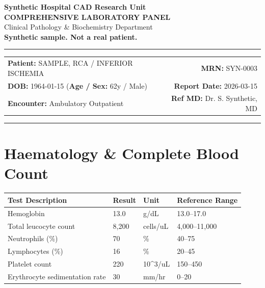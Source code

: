 \documentclass[10pt,a4paper]{article}
\begin{document}
\begin{center}
  {\Large \textbf{Synthetic Hospital CAD Research Unit}}\\
  \vspace{2pt}
  {\normalsize \textbf{COMPREHENSIVE LABORATORY PANEL}}\\
  \vspace{1pt}
  {\footnotesize \textcolor{subtext}{Clinical Pathology \& Biochemistry Department}}\\
  \vspace{4pt}
  {\small \textbf{\textcolor{red!75!black}{Synthetic sample. Not a real patient.}}}\\
  \vspace{3pt}
  \textcolor{linecolor}{\rule{\textwidth}{0.8pt}}
\end{center}

\vspace{2pt}

\noindent
\begin{tabular*}{\textwidth}{@{} l @{\extracolsep{\fill}} r @{}}
  \textbf{Patient:} SAMPLE, RCA / INFERIOR ISCHEMIA & \textbf{MRN:} SYN-0003 \\
  \textbf{DOB:} 1964-01-15 \quad (\textbf{Age / Sex:} 62y / Male) & \textbf{Report Date:} 2026-03-15 \\
  \textbf{Encounter:} Ambulatory Outpatient & \textbf{Ref MD:} Dr. S. Synthetic, MD \\
\end{tabular*}

\vspace{2pt}
\noindent\textcolor{linecolor}{\rule{\textwidth}{0.4pt}}
\vspace{6pt}


\section*{Haematology \& Complete Blood Count}

\begin{tabular}{@{} p{6.4cm} p{2.5cm} p{2.5cm} p{3.1cm} @{}}
  \toprule
  \textbf{Test Description} & \textbf{Result} & \textbf{Unit} & \textbf{Reference Range} \\
  \midrule
  Hemoglobin & 13.0 & g/dL & 13.0--17.0 \\
  Total leucocyte count & 8,200 & cells/uL & 4,000--11,000 \\
  Neutrophils (\%) & 70 & \% & 40--75 \\
  Lymphocytes (\%) & 16 & \% & 20--45 \\
  Platelet count & 220 & 10\textasciicircum 3/uL & 150--450 \\
  Erythrocyte sedimentation rate & 30 & mm/hr & 0--20 \\
  \bottomrule
\end{tabular}
\end{document}
